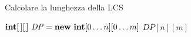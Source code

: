 \begin{frame}[fragile]{Calcolare la lunghezza della LCS}

\vspace{-9pt}
\begin{Procedure}
\caption[A]{\INTEGER \LCS($\Item[\,]\ T,\ \Item[\,]\ U,\ \INTEGER\ n,\ \INTEGER\ m$)}

$\INTARRAY[\,]\ \mathit{DP} = \NEW\ \INTEGER[0 \ldots n][0 \ldots m] $\;
\Return $\mathit{DP}[n][m]$\;

\end{Procedure}


\end{frame}


